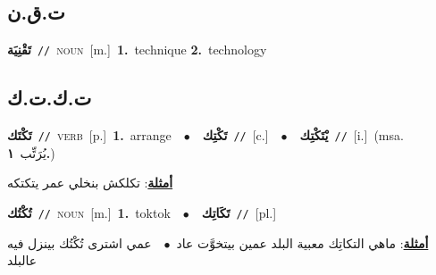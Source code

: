 \documentclass[10pt,a4paper,twoside]{article} %
\begin{document}
\begin{multicols}{2}
\vspace{-3mm}
\subsection*{\color{blue}\foreignlanguage{arabic}{ت.ق.ن}\color{blue}{ (ntws)}} 

{\setlength\topsep{0pt}\textbf{\foreignlanguage{arabic}{تَقْنِيَة}}\ {\color{gray}\texttt{//}\color{black}}\ \textsc{noun}\ [m.]\ \textbf{1.}~technique  \textbf{2.}~technology\ } \vspace{2mm}

\vspace{-3mm}
\subsection*{\color{blue}\foreignlanguage{arabic}{ت.ك.ت.ك}\color{blue}{}} 

{\setlength\topsep{0pt}\textbf{\foreignlanguage{arabic}{تَكْتَك}}\ {\color{gray}\texttt{//}\color{black}}\ \textsc{verb}\ [p.]\ \textbf{1.}~arrange\ \ $\bullet$\ \ \setlength\topsep{0pt}\textbf{\foreignlanguage{arabic}{تَكْتِك}}\ {\color{gray}\texttt{//}\color{black}}\ [c.]\ \ $\bullet$\ \ \setlength\topsep{0pt}\textbf{\foreignlanguage{arabic}{يْتَكْتِك}}\ {\color{gray}\texttt{//}\color{black}}\ [i.]\ \color{gray}(msa. \foreignlanguage{arabic}{يُرَتِّب}~\foreignlanguage{arabic}{\textbf{١.}})\color{black}\  \begin{flushright}\color{gray}\foreignlanguage{arabic}{\textbf{\underline{\foreignlanguage{arabic}{أمثلة}}}: تكلكش بنخلي عمر يتكتكه}\end{flushright}\color{black}} \vspace{2mm}

{\setlength\topsep{0pt}\textbf{\foreignlanguage{arabic}{تُكْتُك}}\ {\color{gray}\texttt{//}\color{black}}\ \textsc{noun}\ [m.]\ \textbf{1.}~toktok\ \ $\bullet$\ \ \setlength\topsep{0pt}\textbf{\foreignlanguage{arabic}{تَكَاتِك}}\ {\color{gray}\texttt{//}\color{black}}\ [pl.]\  \begin{flushright}\color{gray}\foreignlanguage{arabic}{\textbf{\underline{\foreignlanguage{arabic}{أمثلة}}}: ماهي التكاتِك معبية البلد عمين بيتخوَّت عاد\ $\bullet$\ \  عمي اشترى تُكْتُك بينزل فيه عالبلد}\end{flushright}\color{black}} \vspace{2mm}


\end{multicols}
\end{document}
